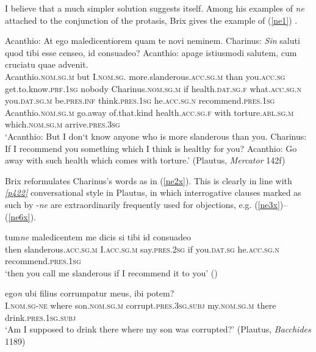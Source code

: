 I believe that a much simpler solution suggests itself. Among his examples of \emph{ne} attached to the conjunction of the protasis, Brix gives the example of (\ref{ne1}) \citep{BrixNiemeyer1888}.

\begin{exe}
\ex
\gll Acanthio: At ego maledicentiorem quam te novi neminem. Charinus: \emph{Sin} saluti quod tibi esse censeo, id consuadeo? Acanthio: apage istiusmodi salutem, cum cruciatu quae advenit.\\
Acanthio.\textsc{nom.sg.m} but I.\textsc{nom.sg.} more.slanderous.\textsc{acc.sg.m} than you.\textsc{acc.sg} get.to.know.\textsc{prf.1sg} nobody Charinus.\textsc{nom.sg.m} if health.\textsc{dat.sg.f} what.\textsc{acc.sg.n} you.\textsc{dat.sg.m} be.\textsc{pres.inf} think.\textsc{pres.1sg} he.\textsc{acc.sg.n} recommend.\textsc{pres.1sg} Acanthio.\textsc{nom.sg.m} go.away of.that.kind health.\textsc{acc.sg.f} with torture.\textsc{abl.sg.m} which.\textsc{nom.sg.m} arrive.\textsc{pres.3sg}\\
\trans `Acanthio: But I don‘t know anyone who is more slanderous than you. Charinus: If I recommend you something which I think is healthy for you? Acanthio: Go away with such health which comes with torture.' (Plautus, \textit{Mercator} 142f) 
\label{ne1x}
\end{exe}

Brix reformulates Charinus's words as in (\ref{ne2x}). This is clearly in line with \hyperlink{p422}{\emph{[p422]}} conversational style in Plautus, in which interrogative clauses marked as such by -\emph{ne} are extraordinarily frequently used for objections, e.g. (\ref{ne3x})--(\ref{ne6x}).

\begin{exe}
\ex
\gll tum\emph{ne} maledicentem me dicis si tibi id consuadeo\\
then slanderous.\textsc{acc.sg.m} I.\textsc{acc.sg.m} say.\textsc{pres.2sg} if you.\textsc{dat.sg} he.\textsc{acc.sg.n} recommend.\textsc{pres.1sg}\\
\trans `then you call me slanderous if I recommend it to you' (\citet{BrixNiemeyer1888}) 
\label{ne2x}
\end{exe}

\begin{exe}
\ex
\gll ego\emph{n} ubi filius corrumpatur meus, ibi potem?\\
I.\textsc{nom.sg}-\textsc{ne} where son.\textsc{nom.sg.m} corrupt.\textsc{pres.3sg.subj} my.\textsc{nom.sg.m} there drink.\textsc{pres.1sg.subj}\\
\trans `Am I supposed to drink there where my son was corrupted?' (Plautus, \textit{Bacchides} 1189) 
\label{ne3x}
\end{exe}

